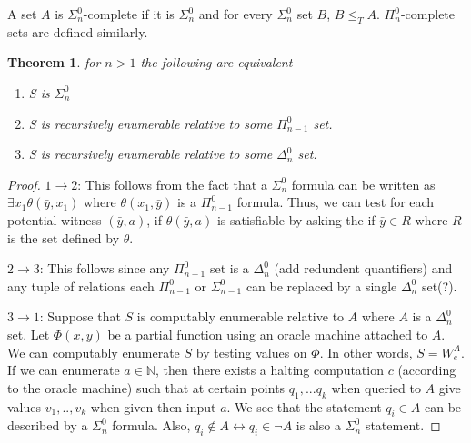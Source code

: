 \documentclass[a4paper,10pt]{article}
\newenvironment{definition}[1][Definition]{\begin{trivlist}
\item[\hskip \labelsep {\bfseries #1}]}{\end{trivlist}}
\newtheorem{theorem}{Theorem}[section]
\newcommand*\NN{\mathbb{N}}
\newcommand*\map{\rightarrow}
\newcommand*\n{\newline\par}
\newcommand*\biject{\leftrightarrow}
\begin{document}
    \begin{definition}
     A set $A$ is $\Sigma_n^0$-complete if it is $\Sigma_n^0$ and for every $\Sigma_n^0$ set $B$, $B \leq_T A$. $\Pi_n^0$-complete sets are defined similarly.
    \end{definition}


    

    \begin{theorem}
      for $n > 1$ the following are equivalent
      \begin{enumerate}
       \item S is $\Sigma_n^0$
       \item S is recursively enumerable relative to some $\Pi_{n-1}^0$ set.
       \item S is recursively enumerable relative to some $\Delta_n^0$ set.
      \end{enumerate}
     \end{theorem}
     
     \begin{proof}
      $1 \map 2$: This follows from the fact that a $\Sigma_n^0$ formula can be written as $\exists x_1 \theta(\bar{y},x_1)$ where $\theta(x_1,\bar{y})$  is a $\Pi_{n-1}^0$ formula. Thus, we can test for each potential witness $(\bar{y},a)$, if
      $\theta(\bar{y},a)$ is satisfiable by asking the if $\bar{y} \in R$ where $R$ is the set defined by $\theta$. \n
      $2 \map 3$: This follows since any $\Pi_{n-1}^0$ set is a $\Delta_n^0$ (add redundent quantifiers) and any tuple of relations each $\Pi_{n-1}^0$ or $\Sigma_{n-1}^0$ can be replaced by a single $\Delta_n^0$ set(?). \n
      $3 \map 1$: Suppose that $S$ is computably enumerable relative to $A$ where $A$ is a $\Delta_n^0$ set. Let $\Phi(x,y )$ be a partial function using an oracle machine attached to $A$. We can computably enumerate $S$ by testing values on $\Phi$. In other words, $S = W_e^A$. If we can enumerate $a \in \NN$, then there exists a halting computation $c$ (according to the oracle machine) such that at certain points $q_1,...q_k$ when queried to $A$ give values $v_1,..,v_k$ when given then input $a$. We see that
      the statement $q_i \in A$ can be described by a $\Sigma_n^0$ formula. Also, $q_i \not\in A \biject q_i \in \neg A$ is also a $\Sigma_n^0$ statement.
     \end{proof}
\end{document}
